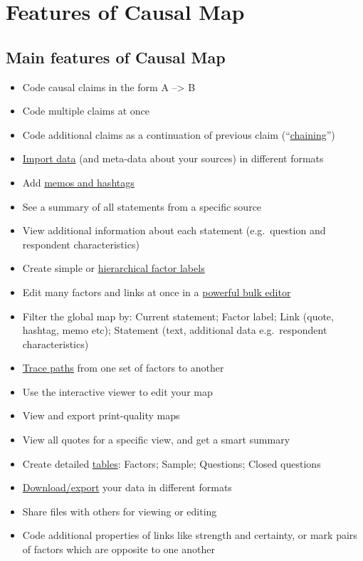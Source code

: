 \documentclass[
]{book}
\providecommand{\tightlist}{%
  \setlength{\itemsep}{0pt}\setlength{\parskip}{0pt}}
\begin{document}
\hypertarget{x}{%
\chapter{Features of Causal Map}\label{x}}

\hypertarget{main-features-of-causal-map}{%
\section{Main features of Causal Map}\label{main-features-of-causal-map}}

\begin{itemize}
\tightlist
\item
  Code causal claims in the form A --\textgreater{} B
\item
  Code multiple claims at once
\item
  Code additional claims as a continuation of previous claim (``\protect\hyperlink{xchaining-links}{chaining}'')
\item
  \protect\hyperlink{ximport}{Import data} (and meta-data about your sources) in different formats
\item
  Add \protect\hyperlink{xmemosandhashtags}{memos and hashtags}
\item
  See a summary of all statements from a specific source
\item
  View additional information about each statement (e.g.~question and respondent characteristics)
\item
  Create simple or \protect\hyperlink{xhierarchical-coding}{hierarchical factor labels}
\item
  Edit many factors and links at once in a \protect\hyperlink{factor-editor}{powerful bulk editor}
\item
  Filter the global map by: Current statement; Factor label; Link (quote, hashtag, memo etc); Statement (text, additional data e.g.~respondent characteristics)
\item
  \protect\hyperlink{xtrace-paths}{Trace paths} from one set of factors to another
\item
  Use the interactive viewer to edit your map
\item
  View and export print-quality maps
\item
  View all quotes for a specific view, and get a smart summary
\item
  Create detailed \protect\hyperlink{core-tables}{tables}: Factors; Sample; Questions; Closed questions
\item
  \protect\hyperlink{xroundtripping}{Download/export} your data in different formats
\item
  Share files with others for viewing or editing
\item
  Code additional properties of links like strength and certainty, or mark pairs of factors which are opposite to one another
\end{itemize}
\end{document}
